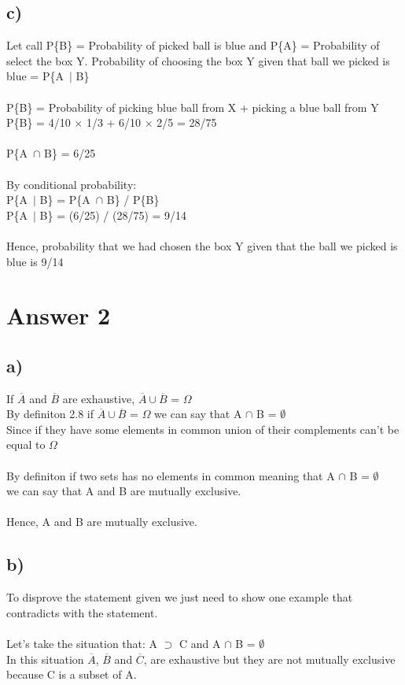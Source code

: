 \documentclass[12pt]{article}
\begin{document}
\subsection*{c)}
Let call P\{B\} = Probability of picked ball is blue and P\{A\} = Probability of select the box Y. Probability of choosing the box Y given that ball we picked is blue = P\{A\ $\mid$ B\} \\
\\
P\{B\} = Probability of picking blue ball from X + picking a blue ball from Y\\
P\{B\} = 4/10 $\times$ 1/3 + 6/10 $\times$ 2/5 = 28/75\\
\\
P\{A\ $\cap$ B\} =  6/25\\
\\
By conditional probability:\\
P\{A\ $\mid$ B\} =  P\{A\ $\cap$ B\} /  P\{B\}\\
P\{A\ $\mid$ B\} = (6/25) / (28/75)  = 9/14 \\
\\
Hence, probability that we had chosen the box Y given that the ball we picked is blue is 9/14
\section*{Answer 2}

\subsection*{a)}
If $\overline{A}$ and $\overline{B}$ are exhaustive, $\overline{A}  \cup  \overline{B}$ = $\Omega$\\
By definiton 2.8 if $\overline{A}  \cup  \overline{B}$ = $\Omega$ we can say that A  $\cap$  B = $\emptyset$\\
Since if they have some elements in common union of their complements can't be equal to  $\Omega$\\
\\
By definiton if two sets has no elements in common meaning that A  $\cap$  B = $\emptyset$\\ we can say that A and B are mutually exclusive.\\
\\
Hence, A and B are mutually exclusive.
\subsection*{b)}
To disprove the statement given we just need to show one example that contradicts with the statement.\\
\\
Let's take the situation that: A $\supset$ C and A $\cap$ B = $\emptyset$ \\
In this situation $\overline{A}$, $\overline{B}$ and $\overline{C}$, are exhaustive but they are not mutually exclusive because C is a subset of A.\\
\end{document}
